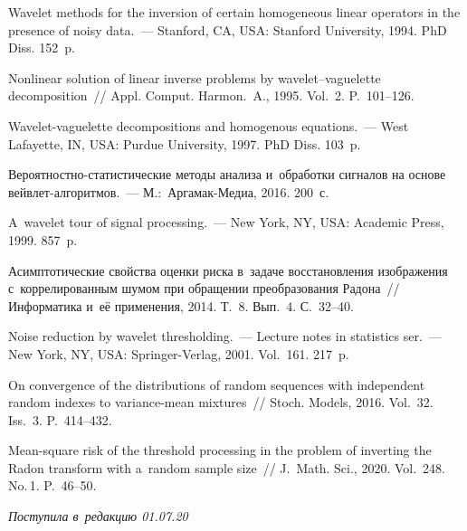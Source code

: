 \begin{multicols}{2}
{{\begin{thebibliography}{99}
 Wavelet methods for the inversion of certain homogeneous 
linear operators in the presence of noisy data.~--- 
Stanford, CA, USA: Stanford University, 1994.  PhD Diss. 152~p.

Nonlinear solution of linear inverse problems by wavelet--vaguelette 
decomposition~// Appl. Comput. Harmon.~A., 1995. Vol.~2. P.~101--126.

 Wavelet-vaguelette decompositions and homogenous equations.~--- 
West Lafayette, IN, USA: Purdue University, 1997. PhD Diss. 103~p.

 Ве\-ро\-ят\-ност\-но-ста\-ти\-сти\-че\-ские 
методы анализа и~обработки сигналов на основе вейв\-лет-ал\-го\-рит\-мов.~---  
М.:~Аргамак-Медиа, 2016. 200~с.

 A~wavelet tour of signal processing.~--- 
New York, NY, USA: Academic Press, 1999. 857~p.

 Асимптотические свойства 
оценки риска в~задаче восстановления изоб\-ра\-же\-ния с~коррелированным шумом
 при обращении преобразования Радона~// Информатика и~её 
 применения, 2014. Т.~8. Вып.~4. С.~32--40.

 Noise reduction by wavelet thresholding.~--- 
Lecture notes in statistics ser.~--- New York, NY, USA: Springer-Verlag, 
2001. Vol.~161. 217~p.

On convergence of the distributions of random sequences with independent 
random indexes to variance-mean mixtures~// Stoch. Models, 2016. 
Vol.~32. Iss.~3. P.~414--432.

 Mean-square risk of the threshold processing in the 
problem of inverting the Radon transform with a~random sample size~// 
J.~Math. Sci., 2020. Vol.~248. No.\,1. P.~46--50.

\end{thebibliography}

 }
 }

\end{multicols}

\vspace*{-12pt}

\hfill{\small\textit{Поступила в~редакцию 01.07.20}}


